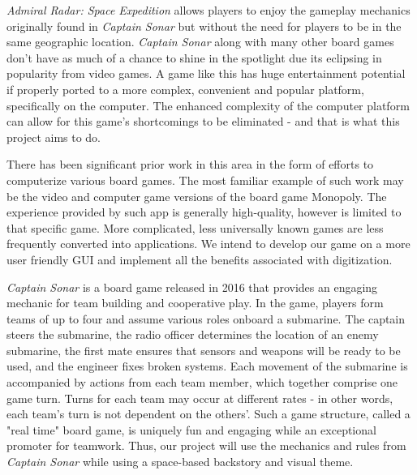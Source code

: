\textit{Admiral Radar: Space Expedition}  allows players to enjoy the gameplay mechanics originally found in \textit{Captain Sonar} but without the need for players to be in the same geographic location. \textit{Captain Sonar} along with many other board games don't have as much of a chance to shine in the spotlight due its eclipsing in popularity from video games. A game like this has huge entertainment potential if properly ported to a more complex, convenient and popular platform, specifically on the computer. The enhanced complexity of the computer platform can allow for this game's shortcomings to be eliminated - and that is what this project aims to do.

There has been significant prior work in this area in the form of efforts to computerize various board games. The most familiar example of such work may be the video and computer game versions of the board game Monopoly. The experience provided by such app is generally high-quality, however is limited to that specific game. More complicated, less universally known games are less frequently converted into applications. We intend to develop our game on a more user friendly GUI and implement all the benefits associated with digitization.

\textit{Captain Sonar} is a board game released in 2016 that provides an engaging mechanic for team building and cooperative play. In the game, players form teams of up to four and assume various roles onboard a submarine. The captain steers the submarine, the radio officer determines the location of an enemy submarine, the first mate ensures that sensors and weapons will be ready to be used, and the engineer fixes broken systems. Each movement of the submarine is accompanied by actions from each team member, which together comprise one game turn. Turns for each team may occur at different rates - in other words, each team's turn is not dependent on the others'. Such a game structure, called a "real time" board game, is uniquely fun and engaging while an exceptional promoter for teamwork. Thus, our project will use the mechanics and rules from \textit{Captain Sonar} while using a space-based backstory and visual theme.
